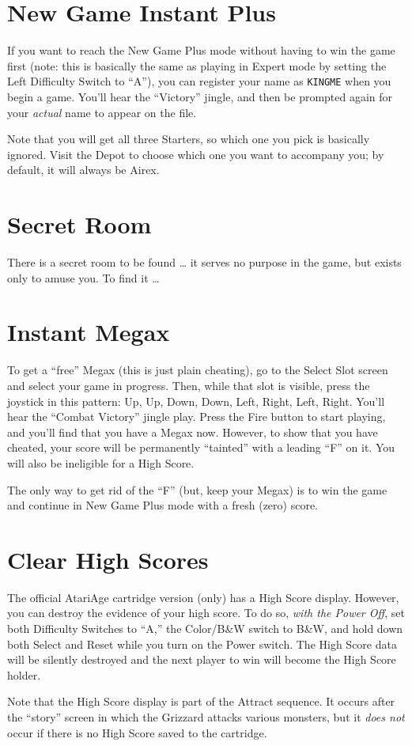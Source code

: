 \documentclass[10pt,twocolumn]{memoir}
\begin{document}
\section{New Game Instant Plus}

If you want  to reach the New  Game Plus mode without having  to win the
game first (note:  this is basically the same as  playing in Expert mode
by setting the  Left Difficulty Switch to ``A''), you  can register your
name  as  \texttt{KINGME}  when  you  begin  a  game.  You'll  hear  the
``Victory'' jingle,  and then be  prompted again for  your \emph{actual}
name to appear on the file.

Note that  you will  get all three  Starters, so which  one you  pick is
basically  ignored. Visit  the Depot  to choose  which one  you want  to
accompany you; by default, it will always be Airex.

\section{Secret Room}

There is a secret  room to be found … it serves no  purpose in the game,
but exists only to amuse you. To find it …

\section{Instant Megax}

To get a ``free'' Megax (this is  just plain cheating), go to the Select
Slot screen and  select your game in progress. Then,  while that slot is
visible, press the  joystick in this pattern: Up, Up,  Down, Down, Left,
Right,  Left, Right.  You'll hear  the ``Combat  Victory'' jingle  play.
Press the  Fire button to start  playing, and you'll find  that you have
a Megax now. However, to show that  you have cheated, your score will be
permanently ``tainted''  with a leading  ``F'' on  it. You will  also be
ineligible for a High Score.

The only way  to get rid of the  ``F'' (but, keep your Megax)  is to win
the game and continue in New Game Plus mode with a fresh (zero) score.

\section{Clear High Scores}

The official AtariAge cartridge version (only) has a High Score display.
However, you  can destroy  the evidence  of your high  score. To  do so,
\emph{with the  Power Off}, set  both Difficulty Switches to  ``A,'' the
Color/B\&W switch  to B\&W, and  hold down  both Select and  Reset while
you  turn on  the Power  switch. The  High Score  data will  be silently
destroyed and the next player to win will become the High Score holder.

Note  that the  High  Score display  is part  of  the Attract  sequence.
It  occurs after  the ``story''  screen  in which  the Grizzard  attacks
various monsters, but it \emph{does not} occur if there is no High Score
saved to the cartridge.
\end{document}
